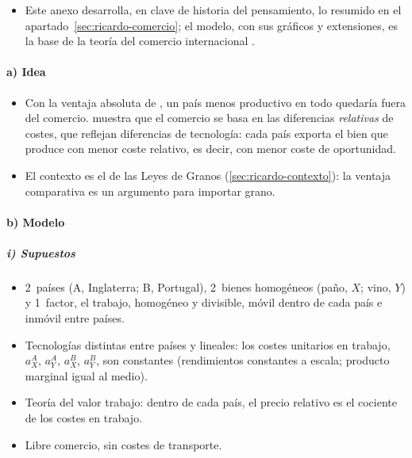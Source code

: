\documentclass[11pt]{article}
\begin{document}
\begin{itemize}
\item Este anexo desarrolla, en clave de historia del pensamiento, lo resumido en el apartado~\ref{sec:ricardo-comercio}; el modelo, con sus gráficos y extensiones, es la base de la teoría del comercio internacional .
\end{itemize}

\paragraph{a) Idea}
\begin{itemize}
\item Con la ventaja absoluta de , un país menos productivo en todo quedaría fuera del comercio.  muestra que el comercio se basa en las diferencias \emph{relativas} de costes, que reflejan diferencias de tecnología: cada país exporta el bien que produce con menor coste relativo, es decir, con menor coste de oportunidad\nocite{Ricardo1821Principles}.
\item El contexto es el de las Leyes de Granos (\ref{sec:ricardo-contexto}): la ventaja comparativa es un argumento para importar grano.
\end{itemize}

\paragraph{b) Modelo}
\subparagraph{i) Supuestos}
\begin{itemize}
\item 2~países (A, Inglaterra; B, Portugal), 2~bienes homogéneos (paño, $X$; vino, $Y$) y 1~factor, el trabajo, homogéneo y divisible, móvil dentro de cada país e inmóvil entre países.
\item Tecnologías distintas entre países y lineales: los costes unitarios en trabajo, $a_X^A$, $a_Y^A$, $a_X^B$, $a_Y^B$, son constantes (rendimientos constantes a escala; producto marginal igual al medio).
\item Teoría del valor trabajo: dentro de cada país, el precio relativo es el cociente de los costes en trabajo.
\item Libre comercio, sin costes de transporte.
\end{itemize}
\end{document}
